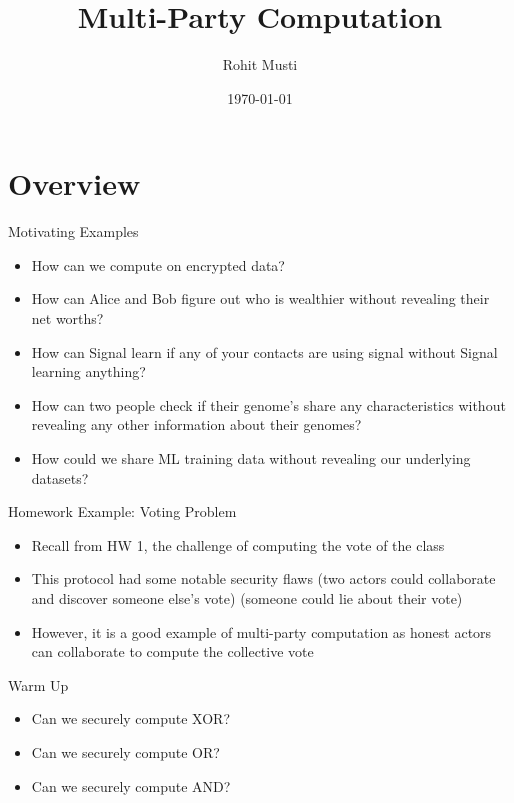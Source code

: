 \documentclass[handout]{beamer}
\title{Multi-Party Computation}
\author{Rohit Musti}
\institute{CUNY - Hunter College}
\date{\today}
\begin{document}
 
\frame{\titlepage}

\section{Overview}

\begin{frame}{Motivating Examples}
  \begin{itemize}
    \item \pause How can we compute on encrypted data?
    \item \pause How can Alice and Bob figure out who is wealthier without revealing their net worths?
    \item \pause How can Signal learn if any of your contacts are using signal without Signal learning anything?
    \item \pause How can two people check if their genome's share any characteristics without revealing any other information about their genomes?
    \item \pause How could we share ML training data without revealing our underlying datasets?
  \end{itemize} 
\end{frame}

\begin{frame}{Homework Example: Voting Problem}
  \begin{itemize}
    \item \pause Recall from HW 1, the challenge of computing the vote of the class
    \item \pause This protocol had some notable security flaws (two actors could collaborate and discover someone else's vote) (someone could lie about their vote)
    \item \pause However, it is a good example of multi-party computation as honest actors can collaborate to compute the collective vote
  \end{itemize}
\end{frame}

\begin{frame}{Warm Up}
  \begin{itemize}
    \item \pause Can we securely compute XOR?
    \item \pause Can we securely compute OR?
    \item \pause Can we securely compute AND?
  \end{itemize}
\end{frame}
\end{document}
